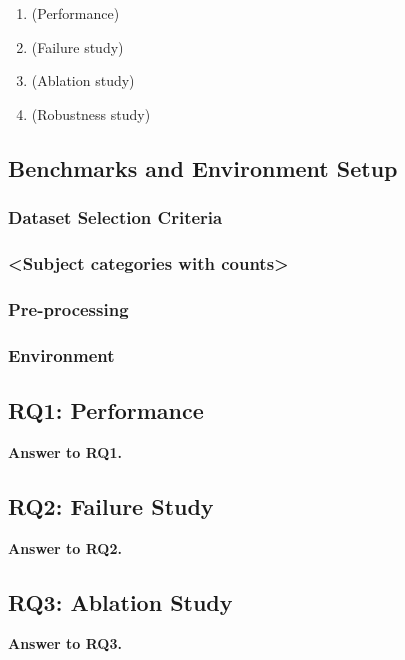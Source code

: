 \documentclass[manuscript,anonymous]{acmart}
\begin{document}
\begin{rqbox}
\begin{enumerate}
  \item[\textbf{RQ1}] (Performance)
  \item[\textbf{RQ2}] (Failure study)
  \item[\textbf{RQ3}] (Ablation study)
  \item[\textbf{RQ4}] (Robustness study)
\end{enumerate}
\end{rqbox}

\subsection{Benchmarks and Environment Setup}\label{sec:setup}

\subsubsection{Dataset Selection Criteria}

\subsubsection{<Subject categories with counts>}

\subsubsection{Pre-processing}\label{sec:preprocess}

\subsubsection{Environment}

\subsection{RQ1: Performance}
\begin{answerbox}\textbf{Answer to RQ1.}\end{answerbox}

\subsection{RQ2: Failure Study}
\begin{answerbox}\textbf{Answer to RQ2.}\end{answerbox}

\subsection{RQ3: Ablation Study}
\begin{answerbox}\textbf{Answer to RQ3.}\end{answerbox}
\end{document}

